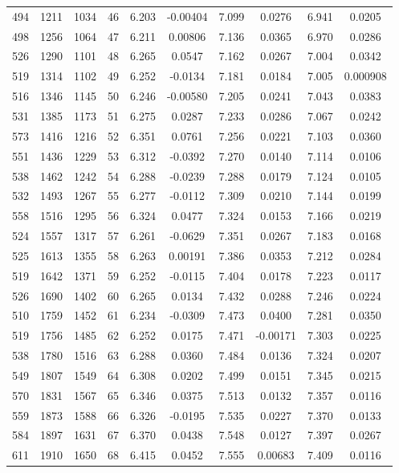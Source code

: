 \documentclass[]{article}
\begin{document}
\begin{tabular}{lccccccccc}
494 & 1211 & 1034 & 46 & 6.203 & -0.00404 & 7.099 & 0.0276 & 6.941 & 0.0205 \\
498 & 1256 & 1064 & 47 & 6.211 & 0.00806 & 7.136 & 0.0365 & 6.970 & 0.0286 \\
526 & 1290 & 1101 & 48 & 6.265 & 0.0547 & 7.162 & 0.0267 & 7.004 & 0.0342 \\
519 & 1314 & 1102 & 49 & 6.252 & -0.0134 & 7.181 & 0.0184 & 7.005 & 0.000908 \\
516 & 1346 & 1145 & 50 & 6.246 & -0.00580 & 7.205 & 0.0241 & 7.043 & 0.0383 \\
531 & 1385 & 1173 & 51 & 6.275 & 0.0287 & 7.233 & 0.0286 & 7.067 & 0.0242 \\
573 & 1416 & 1216 & 52 & 6.351 & 0.0761 & 7.256 & 0.0221 & 7.103 & 0.0360 \\
551 & 1436 & 1229 & 53 & 6.312 & -0.0392 & 7.270 & 0.0140 & 7.114 & 0.0106 \\
538 & 1462 & 1242 & 54 & 6.288 & -0.0239 & 7.288 & 0.0179 & 7.124 & 0.0105 \\
532 & 1493 & 1267 & 55 & 6.277 & -0.0112 & 7.309 & 0.0210 & 7.144 & 0.0199 \\
558 & 1516 & 1295 & 56 & 6.324 & 0.0477 & 7.324 & 0.0153 & 7.166 & 0.0219 \\
524 & 1557 & 1317 & 57 & 6.261 & -0.0629 & 7.351 & 0.0267 & 7.183 & 0.0168 \\
525 & 1613 & 1355 & 58 & 6.263 & 0.00191 & 7.386 & 0.0353 & 7.212 & 0.0284 \\
519 & 1642 & 1371 & 59 & 6.252 & -0.0115 & 7.404 & 0.0178 & 7.223 & 0.0117 \\
526 & 1690 & 1402 & 60 & 6.265 & 0.0134 & 7.432 & 0.0288 & 7.246 & 0.0224 \\
510 & 1759 & 1452 & 61 & 6.234 & -0.0309 & 7.473 & 0.0400 & 7.281 & 0.0350 \\
519 & 1756 & 1485 & 62 & 6.252 & 0.0175 & 7.471 & -0.00171 & 7.303 & 0.0225 \\
538 & 1780 & 1516 & 63 & 6.288 & 0.0360 & 7.484 & 0.0136 & 7.324 & 0.0207 \\
549 & 1807 & 1549 & 64 & 6.308 & 0.0202 & 7.499 & 0.0151 & 7.345 & 0.0215 \\
570 & 1831 & 1567 & 65 & 6.346 & 0.0375 & 7.513 & 0.0132 & 7.357 & 0.0116 \\
559 & 1873 & 1588 & 66 & 6.326 & -0.0195 & 7.535 & 0.0227 & 7.370 & 0.0133 \\
584 & 1897 & 1631 & 67 & 6.370 & 0.0438 & 7.548 & 0.0127 & 7.397 & 0.0267 \\
611 & 1910 & 1650 & 68 & 6.415 & 0.0452 & 7.555 & 0.00683 & 7.409 & 0.0116 \\

\end{tabular}
\end{document}
